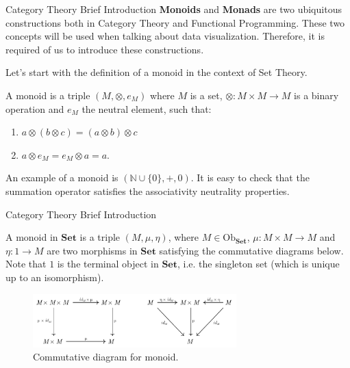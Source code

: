 \documentclass[aspectratio=169,xcolor=dvipsnames,10pt]{beamer}
\theoremstyle{definition}
\begin{document}
\begin{frame}[fragile]{Category Theory Brief Introduction}
	\textbf{Monoids} and \textbf{Monads} are two ubiquitous constructions both in Category Theory and
	Functional Programming. These two concepts will be used when talking about
	data visualization. Therefore, it is required of us to introduce these constructions.

	Let's start with the definition of a monoid in the context of Set Theory.

	\begin{definition}
		A monoid is a triple $(M, \otimes, e_M)$ where $M$ is a set, $\otimes:M\times M \to M$ is a binary operation
		and $e_M$ the neutral element, such that:
		\begin{enumerate}
			\item $a \otimes (b \otimes c) = (a \otimes b) \otimes c$
			\item $a \otimes e_M = e_M \otimes a = a$.
		\end{enumerate}
		\label{def:monoid}
	\end{definition}

	An example of a monoid is $(\mathbb N \cup \{0\}, +, 0)$.
	It is easy to check that the summation operator satisfies the
	associativity neutrality properties.
\end{frame}

\begin{frame}[fragile]{Category Theory Brief Introduction}
	\begin{definition}
		A monoid in $\mathbf{Set}$ is a triple $(M, \mu, \eta)$, where $M \in \text{Ob}_\mathbf{Set}$,
		$\mu:M \times M \to M$ and $\eta: 1 \to M$ are two morphisms in $\mathbf{Set}$ satisfying the
		commutative diagrams below. Note that $1$ is the terminal object in $\mathbf{Set}$, i.e.
		the singleton set (which is unique up to an isomorphism).

		\begin{figure}[H]
			\begin{center}
				\includegraphics[width=0.7\textwidth]{./figs/MonoidalCategory.pdf}
			\end{center}
			\caption{Commutative diagram for monoid.}
			\label{fig:monoid-diagram}
		\end{figure}
		\label{def:monoid-cat}
	\end{definition}
\end{frame}
\end{document}
